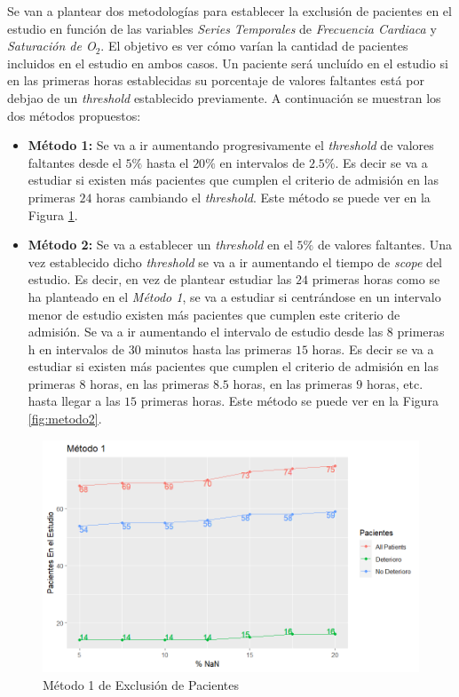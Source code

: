 \newpage

Se van a plantear dos metodologías para establecer la exclusión de pacientes en el estudio en función de las variables \textit{Series Temporales} de \textit{Frecuencia Cardiaca} y \textit{Saturación de O$_2$}. El objetivo es ver cómo varían la cantidad de pacientes incluidos en el estudio en ambos casos. Un paciente será uncluído en el estudio si en las primeras horas establecidas su porcentaje de valores faltantes está por debjao de un \textit{threshold} establecido previamente. A continuación se muestran los dos métodos propuestos: 

\begin{itemize}
    \item \textbf{Método 1:} Se va a ir aumentando progresivamente el \textit{threshold} de valores faltantes desde el $5 \%$ hasta el $20 \%$ en intervalos de $2.5 \%$.  Es decir se va a estudiar si existen más pacientes que cumplen el criterio de admisión en las primeras $24$ horas cambiando el \textit{threshold}. Este método se puede ver en la Figura \ref{fig:metodo1}.
    \item \textbf{Método 2:} Se va a establecer un \textit{threshold} en el $5 \%$ de valores faltantes. Una vez establecido dicho \textit{threshold} se va a ir aumentando el tiempo de \textit{scope} del estudio. Es decir, en vez de plantear estudiar las $24$ primeras horas como se ha planteado en el \textit{Método 1}, se va a estudiar si centrándose en un intervalo menor de estudio existen más pacientes que cumplen este criterio de admisión. Se va a ir aumentando el intervalo de estudio desde las $8$ primeras h en intervalos de $30$ minutos hasta las primeras $15$ horas. Es decir se va a estudiar si existen más pacientes que cumplen el criterio de admisión en las primeras $8$ horas, en las primeras $8.5$ horas, en las primeras $9$ horas, etc. hasta llegar a las $15$ primeras horas. Este método se puede ver en la Figura \ref{fig:metodo2}.
\end{itemize}

\begin{figure}[H]
    \centering
    \includegraphics[scale = 1]{./img/metodo1.png}
    \caption{Método 1 de Exclusión de Pacientes}
    \label{fig:metodo1}
\end{figure}

